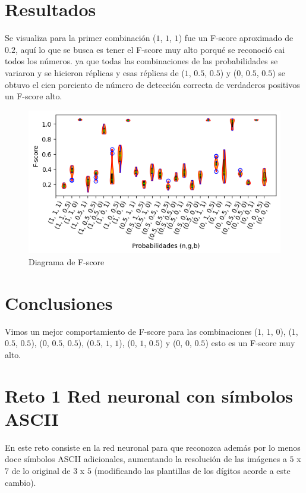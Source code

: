 \documentclass{article}
\begin{document}
\section{Resultados}\label{res}
Se visualiza para la primer combinación ($1$, $1$, $1$) fue un F-score aproximado de $0.2$, aquí lo que se busca es tener el F-score muy alto porqué se reconoció cai todos los números. ya que todas las combinaciones de las probabilidades se variaron y se hicieron réplicas y esas réplicas de ($1$, $0.5$, $0.5$) y ($0$, $0.5$, $0.5$) se obtuvo el cien porciento de número de detección correcta de verdaderos positivos un F-score alto. 

\begin{figure}
    \centering
    \includegraphics[width=150mm]{Figure_1.png}
    \caption{Diagrama de F-score}
    \label{figure}
\end{figure}


\section{Conclusiones}\label{}
Vimos un mejor comportamiento de F-score para las combinaciones ($1$, $1$, $0$), ($1$, $0.5$, $0.5$), ($0$, $0.5$, $0.5$), ($0.5$, $1$, $1$), ($0$, $1$, $0.5$) y ($0$, $0$, $0.5$) esto es un F-score muy alto.


\newpage
\section{Reto 1 Red neuronal con símbolos ASCII }\label{}
En este reto consiste en la red neuronal para que reconozca además por lo menos doce símbolos ASCII adicionales, aumentando la resolución de las imágenes a $5$ x $7$ de lo original de $3$ x $5$ (modificando las plantillas de los dígitos acorde a este cambio).
\end{document}
